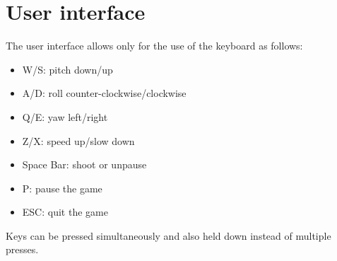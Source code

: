 \section{User interface}
The user interface allows only for the use of the keyboard as follows:
\begin{itemize}
\item W/S: pitch down/up
\item A/D: roll counter-clockwise/clockwise 
\item Q/E: yaw left/right
\item Z/X: speed up/slow down
\item Space Bar: shoot or unpause
\item P: pause the game
\item ESC: quit the game
\end{itemize}
Keys can be pressed simultaneously and also held down instead of multiple presses.

